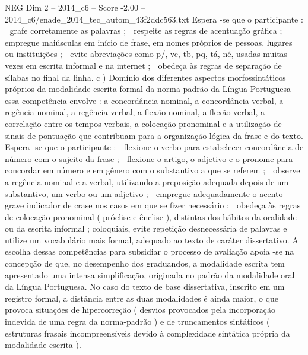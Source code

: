 \begin{textsample}{NEG Dim 2 – 2014\_c6 – Score -2.00 – 2014\_c6/enade\_2014\_tec\_autom\_43f2ddc563.txt}
Espera -se que o participante :  grafe corretamente as palavras ;  respeite as regras de acentuação gráfica ;  empregue maiúsculas em início de frase, em nomes próprios de pessoas, lugares ou instituições ;  evite abreviações como p/, vc, tb, pq, tá, né, usadas muitas vezes em escrita informal e na internet ;  obedeça às regras de separação de sílabas no final da linha. c ) Domínio dos diferentes aspectos morfossintáticos próprios da modalidade escrita formal da norma-padrão da Língua Portuguesa – essa competência envolve : a concordância nominal, a concordância verbal, a regência nominal, a regência verbal, a flexão nominal, a flexão verbal, a correlação entre os tempos verbais, a colocação pronominal e a utilização de sinais de pontuação que contribuam para a organização lógica da frase e do texto.
Espera -se que o participante :  flexione o verbo para estabelecer concordância de número com o sujeito da frase ;  flexione o artigo, o adjetivo e o pronome para concordar em número e em gênero com o substantivo a que se referem ;  observe a regência nominal e a verbal, utilizando a preposição adequada depois de um substantivo, um verbo ou um adjetivo ;  empregue adequadamente o acento grave indicador de crase nos casos em que se fizer necessário ;  obedeça às regras de colocação pronominal ( próclise e ênclise ), distintas dos hábitos da oralidade ou da escrita informal ; coloquiais, evite repetição desnecessária de palavras e utilize um vocabulário mais formal, adequado ao texto de caráter dissertativo.
A escolha dessas competências para subsidiar o processo de avaliação apoia -se na concepção de que, no desempenho dos graduandos, a modalidade escrita tem apresentado uma intensa simplificação, originada no padrão da modalidade oral da Língua Portuguesa.
No caso do texto de base dissertativa, inscrito em um registro formal, a distância entre as duas modalidades é ainda maior, o que provoca situações de hipercorreção ( desvios provocados pela incorporação indevida de uma regra da norma-padrão ) e de truncamentos sintáticos ( estruturas frasais incompreensíveis devido à complexidade sintática própria da modalidade escrita ).

\end{textsample}
